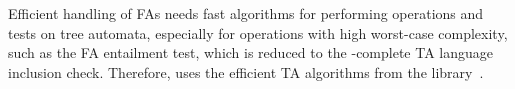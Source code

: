 {Efficient handling of FAs needs fast algorithms for performing operations and
tests on tree automata, especially for operations with high worst-case
complexity, such as the FA entailment test, which is reduced to the
\exptime-complete TA language inclusion check.
Therefore, \forester uses the efficient TA algorithms from the \vata
library~\cite{libvata}.


%
%
%
%
%
%
%

}
